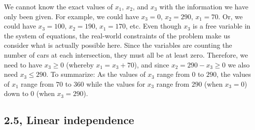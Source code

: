 \begin{problems}
\begin{solution}
\begin{subproblems}
   \subproblem We cannot know the exact values of $x_1$, $x_2$, and
   $x_3$ with the information we have only been given.  For example,
   we could have $x_3=0$, $x_2 = 290$, $x_1=70$.  Or, we could have
   $x_3= 100$, $x_2= 190$, $x_1=170$, etc. \newline \newline
   Even though $x_3$ is a free variable in the system of equations,
   the real-world constraints of the problem make us consider what is
   actually possible here.  Since the variables are counting the
   number of cars at each intersection, they must all be at least
   zero.  Therefore, we need to have $x_3 \geq 0$ (whereby
   $x_1 = x_3 + 70$), and since $x_2 = 290-x_3 \geq 0$ we also need
   $x_3 \leq 290$.%
   \newline \newline
   To summarize: As the values of $x_3$ range from $0$ to $290$, the
   values of $x_1$ range from $70$ to $360$ while the values for $x_3$
   range from $290$ (when $x_3=0$) down to $0$ (when $x_3 = 290$).
 \end{subproblems}
\end{solution}




\end{problems} \setcounter{problem}{0}

\newpage

\subsection{2.5, Linear independence}


